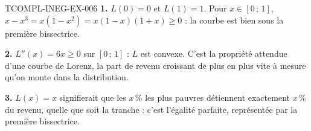 \begin{corrige}{TCOMPL-INEG-EX-006}
\textbf{1.} $L(0)=0$ et $L(1)=1$. Pour $x\in[0\,;\,1]$,
$x-x^3=x(1-x^2)=x(1-x)(1+x)\geq0$ : la courbe est bien sous la première
bissectrice.

\textbf{2.} $L''(x)=6x\geq0$ sur $[0\,;\,1]$ : $L$ est convexe. C'est la
propriété attendue d'une courbe de Lorenz, la part de revenu croissant de plus
en plus vite à mesure qu'on monte dans la distribution.

\textbf{3.} $L(x)=x$ signifierait que les $x\,\%$ les plus pauvres détiennent
exactement $x\,\%$ du revenu, quelle que soit la tranche : c'est l'égalité
parfaite, représentée par la première bissectrice.
\end{corrige}
